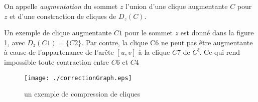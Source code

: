 \documentclass[onecolumn, 12pt]{book}
\begin{document}
On appelle {\em  augmentation} du sommet $z$ l'union d'une clique augmentante  $C$ pour $z$ et d'une constraction de cliques de $D_z(C)$.

Un exemple de clique augmentante $C1$ pour le sommet $z$ est donn\'e dans la figure \ref{exempleAlgoCorrectionGraphe}, avec $D_z(C1) = \{C2\}$.
Par contre, la clique C6 ne peut pas \^etre augmentante \`a cause de l'appartenance de l'ar\^ete $[u,v]$ \`a la clique $C7$ de $C^i$. Ce qui rend impossible toute contraction entre $C6$ et $C4$
\begin{centering} 
\begin{figure}[htb!]
\texttt{[image: ./correctionGraph.eps]} \vspace{-0.5em}
\caption{un exemple de compression de cliques}
\label{exempleAlgoCorrectionGraphe}
\end{figure}
\end{centering} 
\end{document}
